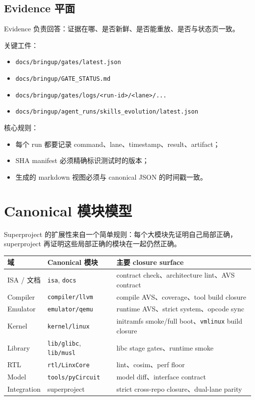 \documentclass[UTF8,11pt,a4paper]{ctexart}
\begin{document}
\subsection{Evidence 平面}

Evidence 负责回答：证据在哪、是否新鲜、是否能重放、是否与状态页一致。

关键工件：

\begin{itemize}
  \item \texttt{docs/bringup/gates/latest.json}
  \item \texttt{docs/bringup/GATE\_STATUS.md}
  \item \texttt{docs/bringup/gates/logs/<run-id>/<lane>/...}
  \item \texttt{docs/bringup/agent\_runs/skills\_evolution/latest.json}
\end{itemize}

核心规则：

\begin{itemize}
  \item 每个 run 都要记录 command、lane、timestamp、result、artifact；
  \item SHA manifest 必须精确标识测试时的版本；
  \item 生成的 markdown 视图必须与 canonical JSON 的时间戳一致。
\end{itemize}

\section{Canonical 模块模型}

Superproject 的扩展性来自一个简单规则：每个大模块先证明自己局部正确，
superproject 再证明这些局部正确的模块在一起仍然正确。

\begin{longtable}{>{\raggedright\arraybackslash}p{} >{\raggedright\arraybackslash}p{} >{\raggedright\arraybackslash}p{}}
\toprule
域 & Canonical 模块 & 主要 closure surface \\
\midrule
\endhead
ISA / 文档 & \texttt{isa}, \texttt{docs} & contract check、architecture lint、AVS contract \\
Compiler & \texttt{compiler/llvm} & compile AVS、coverage、tool build closure \\
Emulator & \texttt{emulator/qemu} & runtime AVS、strict system、opcode sync \\
Kernel & \texttt{kernel/linux} & initramfs smoke/full boot、\texttt{vmlinux} build closure \\
Library & \texttt{lib/glibc}, \texttt{lib/musl} & libc stage gates、runtime smoke \\
RTL & \texttt{rtl/LinxCore} & lint、cosim、perf floor \\
Model & \texttt{tools/pyCircuit} & model diff、interface contract \\
Integration & superproject & strict cross-repo closure、dual-lane parity \\
\bottomrule
\end{longtable}
\end{document}
